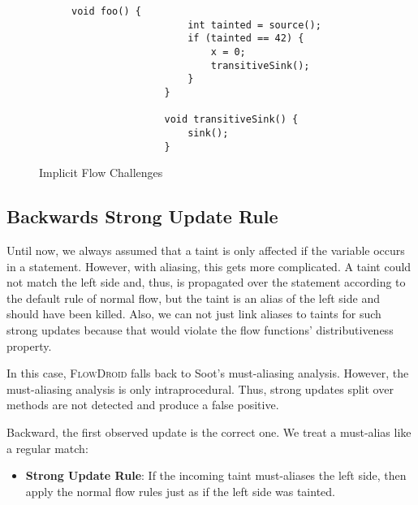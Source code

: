 \documentclass[../draft.tex]{subfiles}
\begin{document}
    \begin{figure}[tbp]
        \centering
        \begin{subfigure}[b]{0.45\textwidth}
            \centering
            \begin{lstlisting}[gobble=16]
                void foo() {
                    int tainted = source();
                    if (tainted == 42) {
                        x = 0;
                        transitiveSink();
                    }
                }

                void transitiveSink() {
                    sink();
                }
            \end{lstlisting}
        \end{subfigure}
        \caption{Implicit Flow Challenges}
        \label{lst:impflow}
    \end{figure}

    \subsection{Backwards Strong Update Rule}
    Until now, we always assumed that a taint is only affected if the variable occurs in a statement.
    However, with aliasing, this gets more complicated.
    A taint could not match the left side and, thus, is propagated over the statement according to the default rule of normal flow, but the taint is an alias of the left side and should have been killed.
    Also, we can not just link aliases to taints for such strong updates because that would violate the flow functions' distributiveness property.

    In this case, \textsc{FlowDroid} falls back to Soot's must-aliasing analysis. However, the must-aliasing analysis is only intraprocedural. Thus, strong updates split over methods are not detected and produce a false positive.

    Backward, the first observed update is the correct one. We treat a must-alias like a regular match:
    \begin{itemize}
        \item \textbf{Strong Update Rule}: If the incoming taint must-aliases the left side, then apply the normal flow rules just as if the left side was tainted.
    \end{itemize}
\end{document}
